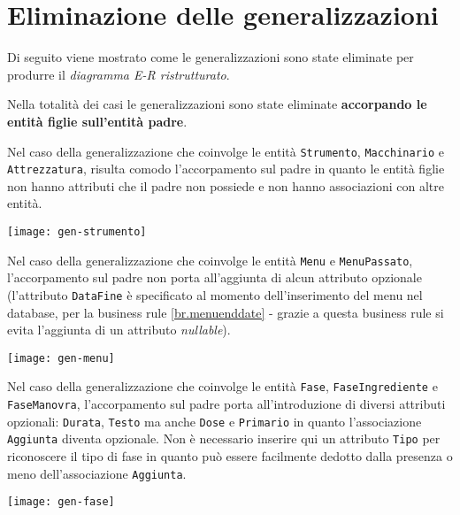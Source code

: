 \section{Eliminazione delle generalizzazioni}\label{sec:generalizations}
Di seguito viene mostrato come le generalizzazioni sono state eliminate per produrre
il {\it diagramma E-R ristrutturato}.

Nella totalità dei casi le generalizzazioni sono state eliminate {\bf accorpando
le entità figlie sull'entità padre}.

\vspace{15pt}

Nel caso della generalizzazione che coinvolge le entità {\tt Strumento}, {\tt Macchinario}
e {\tt Attrezzatura}, risulta comodo l'accorpamento sul padre in quanto le entità figlie
non hanno attributi che il padre non possiede e non hanno associazioni con altre entità.

\vspace{5pt}\centerline{\texttt{[image: gen-strumento]}}

\vspace{15pt}

Nel caso della generalizzazione che coinvolge le entità {\tt Menu} e  {\tt MenuPassato},
l'accorpamento sul padre non porta all'aggiunta di alcun attributo opzionale (l'attributo
{\tt DataFine} è specificato al momento dell'inserimento del menu nel database, per la business
rule \ref{br.menuenddate} - grazie a questa business rule si evita l'aggiunta di un attributo {\it nullable}).

\vspace{5pt}\centerline{\texttt{[image: gen-menu]}}

\vspace{15pt}

Nel caso della generalizzazione che coinvolge le entità {\tt Fase}, {\tt FaseIngrediente}
e {\tt FaseManovra}, l'accorpamento sul padre porta all'introduzione di diversi attributi
opzionali: {\tt Durata}, {\tt Testo} ma anche {\tt Dose} e {\tt Primario} in quanto l'associazione
{\tt Aggiunta} diventa opzionale. Non è necessario inserire qui un attributo {\tt Tipo} per
riconoscere il tipo di fase in quanto può essere facilmente dedotto dalla presenza o meno
dell'associazione {\tt Aggiunta}.

\vspace{5pt}\centerline{\texttt{[image: gen-fase]}}

\vspace{15pt}

